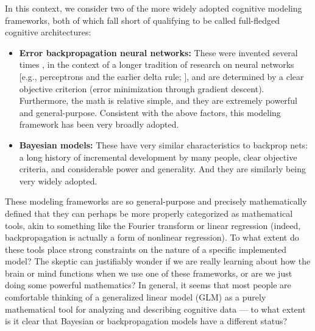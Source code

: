 \documentclass[11pt,twoside]{article}
\begin{document}
In this context, we consider two of the more widely adopted cognitive
modeling frameworks, both of which fall short of qualifying to be
called full-fledged cognitive architectures:
\begin{itemize}
\item {\bf Error backpropagation neural networks:} These were invented
  several times
  \cite{BrysonHo69,Werbos74,RumelhartHintonWilliams86,RumelhartMcClelland86,McClellandRumelhart86},
  in the context of a longer tradition of research on neural networks
  [e.g., perceptrons \cite{Rosenblatt59,Rosenblatt62,MinskyPapert62}
    and the earlier delta rule; \cite{WidrowHoff60,}], and are
  determined by a clear objective criterion (error minimization
  through gradient descent).  Furthermore, the math is relative
  simple, and they are extremely powerful and general-purpose.
  Consistent with the above factors, this modeling framework has been
  very broadly adopted.
\item {\bf Bayesian models:} These have very similar characteristics
  to backprop nets: a long history of incremental development by many
  people, clear objective criteria, and considerable power and
  generality.  And they are similarly being very widely adopted.
\end{itemize}

These modeling frameworks are so general-purpose and precisely
mathematically defined that they can perhaps be more properly
categorized as mathematical tools, akin to something like the Fourier
transform or linear regression (indeed, backpropagation is actually a
form of nonlinear regression).  To what extent do these tools place
strong constraints on the nature of a specific implemented model?  The
skeptic can justifiably wonder if we are really learning about how the
brain or mind functions when we use one of these frameworks, or are we
just doing some powerful mathematics?  In general, it seems that most
people are comfortable thinking of a generalized linear model (GLM) as
a purely mathematical tool for analyzing and describing cognitive data
--- to what extent is it clear that Bayesian or backpropagation models
have a different status?
\end{document}
